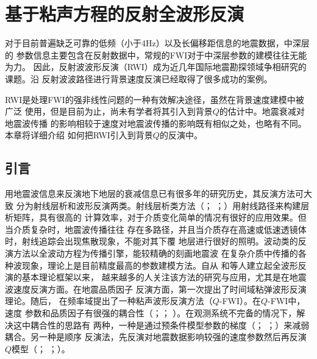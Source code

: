 
\chapter{基于粘声方程的反射全波形反演}

对于目前普遍缺乏可靠的低频（小于4Hz）以及长偏移距信息的地震数据，中深层的
参数信息主要包含在反射数据中，常规的FWI对于中深层参数的建模往往无能为力。
因此，反射波波形反演（RWI）成为近几年国际地震勘探领域争相研究的课题。沿
反射波波路径进行背景速度反演已经取得了很多成功的案例。

RWI是处理FWI的强非线性问题的一种有效解决途径，虽然在背景速度建模中被广泛
使用，但是目前为止，尚未有学者将其引入到背景$Q$的估计中。地震衰减对地震波传播
的影响相较于速度对地震波传播的影响既有相似之处，也略有不同。本章将详细介绍
如何把RWI引入到背景$Q$的反演中。

\vspace{0.5cm}
\section{引言}
\vspace{0.5cm}

用地震波信息来反演地下地层的衰减信息已有很多年的研究历史，其反演方法可大致
分为射线层析和波形反演两类。射线层析类方法（；
；）用射线路径来构建层析矩阵，具有很高的
计算效率，对于介质变化简单的情况有很好的应用效果。但当介质复杂时，地震波传播往往
存在多路径，并且当介质存在高速或低速透镜体时，射线追踪会出现焦散现象，不能对其下覆
地层进行很好的照明。波动类的反演方法以全波动方程为传播引擎，能较精确的刻画地震波
在复杂介质中传播的各种波现象，理论上是目前精度最高的参数建模方法。自从
和等人建立起全波形反演的基本理论框架以来，
越来越多的人关注该方法的研究与应用，尤其是在地震波速度反演方面。在地震品质因子
反演方面，第一次提出了时间域粘弹波形反演理论。随后，
在频率域提出了一种粘声波形反演方法（$Q$-FWI）。在$Q$-FWI中，速度
参数和品质因子有很强的耦合性（；；
）。在观测系统不完备的情况下，解决这中耦合性的思路有
两种，一种是通过预条件模型参数的梯度（；
；）来减弱耦合。另一种是顺序
反演法，先反演对地震数据影响较强的速度参数然后再反演$Q$模型（；
；）。

